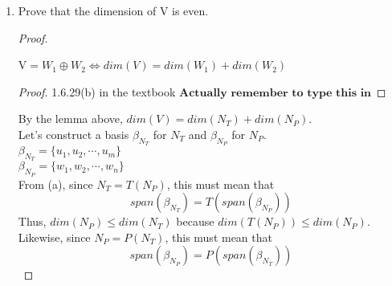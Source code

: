 \documentclass[11pt]{scrartcl}
\begin{document}
\begin{enumerate}[label=\alph*.]
{\begin{proof}
\begin{enumerate}[label=\roman*.]
{\begin{enumerate}[label=\arabic*.]
{				                  by Theorem 2.11. Since $\mathrm{V}$ is a vector space $n_t + n_p \in V$ by closure under addition.\\
				                  Thus, $ x \in \mathrm{V}$ and it follows that $N_T + N_P \subseteq \mathrm{V}$.
				                  }
				            \item{
				                  $\mathrm{V} \subseteq N_T + N_P $\\
				                  Let $x \in V$. We know that $x = P \circ T(x) + T \circ P(x)$.\\
				                  Notice that $P \circ T(x) \in N_P$ because $P(P \circ T(x)) = 0$.\\
				                  Similarly, $T \circ P(x) \in N_T$ because $T(T \circ P(x)) = 0$.\\
				                  Thus, $N_T + N_P \subseteq \mathrm{V}$.
				                  }
			            \end{enumerate}
			            Therefore, $N_T + N_P = \mathrm{V}$.
			            }
		      \end{enumerate}
		      Therefore, by definition $\mathrm{V} = N_T \oplus N_P$.
	      \end{proof}
	      }
	\item{
	      Prove that the dimension of $\mathrm{V}$ is even.
	      \begin{proof}\
		      \begin{lemma}
			      $\mathrm{V} = W_1 \oplus W_2 \Leftrightarrow dim(V) = dim(W_1) + dim(W_2)$\
			      \begin{proof}
				      1.6.29(b) in the textbook
				      $\textbf{Actually remember to type this in}$
			      \end{proof}
		      \end{lemma}
		      By the lemma above, $dim(V) = dim(N_T) + dim(N_P)$.\\
		      Let's construct a basis $\beta_{N_T}$ for $N_T$ and $\beta_{N_P}$ for $N_P$.\\
		      $\beta_{N_T} = \{u_1, u_2, \cdots, u_m\}$\\
		      $\beta_{N_P} = \{w_1, w_2, \cdots, w_n\}$\\
		      From (a), since $N_T = T(N_P)$, this must mean that $$span(\beta_{N_T}) = T(span(\beta_{N_P})) $$ %
		      Thus, $dim(N_P) \leq dim(N_T)$ because  $dim(T(N_P)) \leq dim(N_P)$.\\
		      Likewise, since $N_P = P(N_T)$, this must mean that $$span(\beta_{N_P}) = P(span(\beta_{N_T})) $$ %

\end{proof}}
\end{enumerate}
\end{document}
